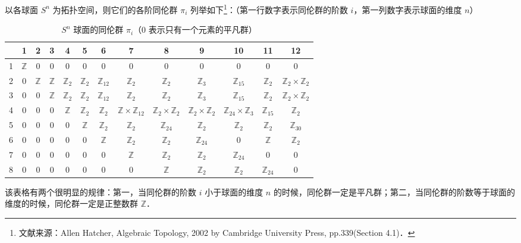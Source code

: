 

以各球面 $S^n$ 为拓扑空间，则它们的各阶同伦群 $\pi_i$ 列举如下\footnote{文献来源：Allen Hatcher, Algebraic Topology, 2002 by Cambridge University Press, pp.339(Section 4.1)．}：（第一行数字表示同伦群的阶数 $i$，第一列数字表示球面的维度 $n$）

\begin{table}[ht]
\caption{$S^n$ 球面的同伦群 $\pi_i$（$0$ 表示只有一个元素的平凡群）}\label{SphHmt_tab1}
\begin{tabular}{|c|c|c|c|c|c|c|c|c|c|c|c|c|}
\hline
 & 1 & 2 & 3 & 4 & 5 & 6 & 7 & 8 & 9 & 10 & 11 & 12 \\
\hline
1 & $\mathbb{Z}$ & 0 & 0 & 0 & 0 & 0 & 0 & 0 & 0 & 0 & 0 & 0 \\
\hline
2 & 0 & $\mathbb{Z}$ & $\mathbb{Z}$ & $\mathbb{Z}_2$ & $\mathbb{Z}_2$ & $\mathbb{Z}_{12}$ & $\mathbb{Z}_2$ & $\mathbb{Z}_2$ & $\mathbb{Z}_3$ & $\mathbb{Z}_{15}$ & $\mathbb{Z}_2$ & $\mathbb{Z}_2\times\mathbb{Z}_2$\\
\hline
3 & 0 & 0 & $\mathbb{Z}$ & $\mathbb{Z}_2$ & $\mathbb{Z}_2$ & $\mathbb{Z}_{12}$ & $\mathbb{Z}_2$ & $\mathbb{Z}_2$ & $\mathbb{Z}_3$ & $\mathbb{Z}_{15}$ & $\mathbb{Z}_2$ & $\mathbb{Z}_2\times\mathbb{Z}_2$ \\
\hline
4 & 0 & 0 & 0 & $\mathbb{Z}$ & $\mathbb{Z}_2$ & $\mathbb{Z}_2$ & $\mathbb{Z}\times\mathbb{Z}_{12}$ & $\mathbb{Z}_2\times\mathbb{Z}_2$ & $\mathbb{Z}_2\times\mathbb{Z}_2$ & $\mathbb{Z}_{24}\times\mathbb{Z}_3$ & $\mathbb{Z}_{15}$ & $\mathbb{Z}_2$ \\
\hline
5 & 0 & 0 & 0 & 0 & $\mathbb{Z}$ & $\mathbb{Z}_2$ & $\mathbb{Z}_2$ & $\mathbb{Z}_{24}$ & $\mathbb{Z}_2$ & $\mathbb{Z}_2$ & $\mathbb{Z}_2$ & $\mathbb{Z}_{30}$ \\
\hline
6 & 0 & 0 & 0 & 0 & 0 & $\mathbb{Z}$ & $\mathbb{Z}_2$ & $\mathbb{Z}_2$ & $\mathbb{Z}_{24}$ & 0 & $\mathbb{Z}$ & $\mathbb{Z}_2$ \\
\hline
7 & 0 & 0 & 0 & 0 & 0 & 0 & $\mathbb{Z}$ & $\mathbb{Z}_2$ & $\mathbb{Z}_2$ & $\mathbb{Z}_{24}$ & 0 & 0 \\
\hline
8 & 0 & 0 & 0 & 0 & 0 & 0 & 0 & $\mathbb{Z}$ & $\mathbb{Z}_2$ & $\mathbb{Z}_2$ & $\mathbb{Z}_{24}$ & 0 \\
\hline
\end{tabular}
\end{table}

该表格有两个很明显的规律：第一，当同伦群的阶数 $i$ 小于球面的维度 $n$ 的时候，同伦群一定是平凡群；第二，当同伦群的阶数等于球面的维度的时候，同伦群一定是正整数群 $\mathbb{Z}$．
